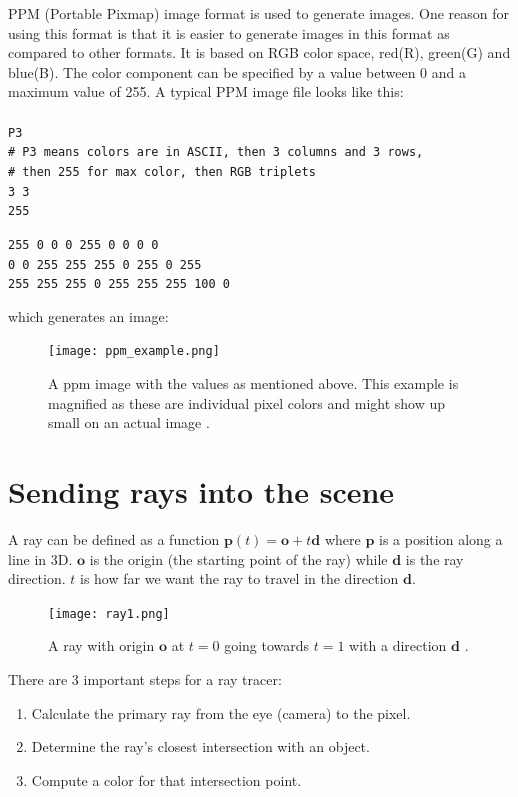 \documentclass[11pt,a4paper]{article}
\begin{document}
	PPM (Portable Pixmap) image format is used to generate images. One reason for using this format is that it is easier to generate images in this format as compared to other formats. It is based on RGB color space, red(R), green(G) and blue(B). The color component can be specified by a value between 0 and a maximum value of 255. A typical PPM image file looks like this:\\
	\\
	\texttt{P3} \\
	\texttt{\# P3 means colors are in ASCII, then 3 columns and 3 rows,} \\
	\texttt{\# then 255 for max color, then RGB triplets}\\
	\texttt{3 3}\\
	\texttt{255}
	\begin{tabbing}
		\texttt{255 0 0 \hspace*{1.55cm} 0 255 0 \hspace*{1.98cm} 0 0 0}\\
		\texttt{0 0 255 \hspace*{1.55cm} 255 255 0 \hspace*{1.55cm} 255 0 255}\\
		\texttt{255 255 255 \hspace*{0.7cm} 0 255 255 \hspace*{1.53cm} 255 100 0}
	\end{tabbing}
	which generates an image:
	\begin{figure}[H]
		\centering
		\texttt{[image: ppm\_example.png]}
		\caption{\centering A ppm image with the values as mentioned above. This example is magnified as these are individual pixel colors and might show up small on an actual image \protect\cite{ppmformat}.}
	\end{figure}
	
	\section{Sending rays into the scene}
	A ray can be defined as a function $\boldsymbol{p}(t) = \boldsymbol{o} + t\boldsymbol{d}$ where $\boldsymbol{p}$ is a position along a line in 3D. $\boldsymbol{o}$ is the origin (the starting point of the ray) while $\boldsymbol{d}$ is the ray direction. $t$ is how far we want the ray to travel in the direction $\boldsymbol{d}$.\\
	\begin{figure}[H]
		\centering
		\texttt{[image: ray1.png]}
		\caption{\centering A ray with origin $\boldsymbol{o}$ at $t=0$ going towards $t=1$ with a direction $\boldsymbol{d}$ \protect\cite{Shirley2020RTW1}.}
	\end{figure}
	\noindent
	There are 3 important steps for a ray tracer:
	\begin{enumerate}
		\item Calculate the primary ray from the eye (camera) to the pixel.
		\item Determine the ray's closest intersection with an object.
		\item Compute a color for that intersection point.
	\end{enumerate}
	
\end{document}
